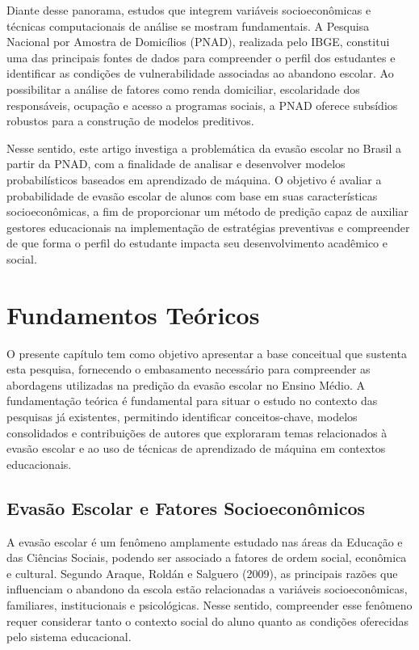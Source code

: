 \documentclass[english, spanish, brazilian]{RBIEarticle} %
\begin{document}
Diante desse panorama, estudos que integrem variáveis socioeconômicas e técnicas computacionais de análise se mostram fundamentais. A Pesquisa Nacional por Amostra de Domicílios (PNAD), realizada pelo IBGE, constitui uma das principais fontes de dados para compreender o perfil dos estudantes e identificar as condições de vulnerabilidade associadas ao abandono escolar. Ao possibilitar a análise de fatores como renda domiciliar, escolaridade dos responsáveis, ocupação e acesso a programas sociais, a PNAD oferece subsídios robustos para a construção de modelos preditivos.

Nesse sentido, este artigo investiga a problemática da evasão escolar no Brasil a partir da PNAD, com a finalidade de analisar e desenvolver modelos probabilísticos baseados em aprendizado de máquina. O objetivo é avaliar a probabilidade de evasão escolar de alunos com base em suas características socioeconômicas, a fim de proporcionar um método de predição capaz de auxiliar gestores educacionais na implementação de estratégias preventivas e compreender de que forma o perfil do estudante impacta seu desenvolvimento acadêmico e social.



\section{Fundamentos Teóricos}

O presente capítulo tem como objetivo apresentar a base conceitual que sustenta esta pesquisa, fornecendo o embasamento necessário para compreender as abordagens utilizadas na predição da evasão escolar no Ensino Médio. A fundamentação teórica é fundamental para situar o estudo no contexto das pesquisas já existentes, permitindo identificar conceitos-chave, modelos consolidados e contribuições de autores que exploraram temas relacionados à evasão escolar e ao uso de técnicas de aprendizado de máquina em contextos educacionais.

\subsection{Evasão Escolar e Fatores Socioeconômicos}
A evasão escolar é um fenômeno amplamente estudado nas áreas da Educação e das Ciências Sociais, podendo ser associado a fatores de ordem social, econômica e cultural. Segundo Araque, Roldán e Salguero (2009), as principais razões que influenciam o abandono da escola estão relacionadas a variáveis socioeconômicas, familiares, institucionais e psicológicas. Nesse sentido, compreender esse fenômeno requer considerar tanto o contexto social do aluno quanto as condições oferecidas pelo sistema educacional.
\end{document}
